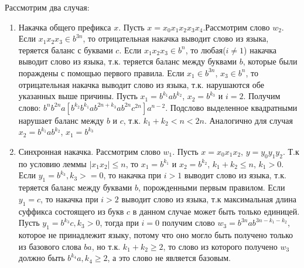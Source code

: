 \documentclass[a4paper, 14pt]{article}
\begin{document}
Рассмотрим два случая:

\begin{enumerate}
  \item{Накачка общего префикса $x$. Пусть $x = x_0 x_1 x_2 x_3 x_4$.Рассмотрим слово $w_2$. Если $x_1 x_2 x_3 \in b^{3n}$, то отрицательная накачка выводит слово из языка, теряется баланс с буквами $c$. Если $x_1 x_2 x_3 \in b^{n}$, то любая($i \ne 1$) накачка выводит слово из языка}, т.к. теряется баланс между буквами $b$, которые были пораждены с помощью первого правила. Если $x_1 \in b^{3n}$, $x_3 \in b^{n}$, то отрицательная накачка выводит слово из языка, т.к. нарушаются обе указанных выше причины. Пусть $x_1 = b^{k_1} a b^{k_2}$, $x_2 = b^{k_3}$ и $i = 2$. Получим слово: $b^{n} b^{2n} a [b^{k_2} b^{k_1} a b^{2n + k_3} a b^{2n} c^{2n}] a^{n-2}$. Подслово выделенное квадратными нарушает баланс между $b$ и $c$, т.к. $k_1 + k_2 < n < 2n$. Аналогично для случая  $x_2 = b^{k_1} a b^{k_2}$, $x_1 = b^{k_3}$ 

  \item{Синхронная накачка. Рассмотрим слово $w_1$. Пусть $x = x_0 x_1 x_2$, $y = y_0 y_1 y_2$. Т.к по условию леммы $|x_1 x_2| \leq n$, то $x_1 = b^{k_1}$ и $x_2 = b^{k_2}$, $k_1 + k_2 \leq n$, $k_1 > 0$}. Если $y_1 = b^{k_3}, k_3 >= 0$, то накачка при $i > 1$ выводит слово из языка, т.к. теряется баланс между буквами $b$, порожденными первым правилом. Если $y_1 = c$, то накачка при $i > 2$ выводит слово из языка, т.к максимальная длина суффикса состоящего из букв $c$ в данном случае может быть только единицей.
    Пусть $y_1 = b^{k_3}c, k_3 > 0$, тогда при $i = 0$ получим слово $w_3 = b^{3n}ab^{3n - k_1 - k_2}$, которое не принадлежит языку, потому что оно могло быть получено только из базового слова $ba$, но т.к. $k_1 + k_2 \geq 2$, то слово из которого получено $w_3$ должно быть $b^{k_4}a, k_4 \geq 2$, а это слово не является базовым. 
\end{enumerate}
\end{document}
